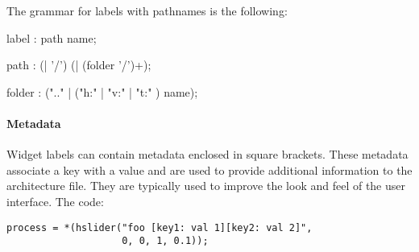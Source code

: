 The grammar for labels with pathnames is the following:

\begin{rail}
 label : path name;
\end{rail}

\begin{rail}
 path : (| '/') (| (folder '/')+);
\end{rail}

\begin{rail}
 folder : (".." | ("h:" | "v:" | "t:" ) name);
\end{rail}

\paragraph{Metadata}
Widget labels can contain metadata enclosed in square brackets. These metadata associate a key with a value and are used to provide additional information to the architecture file.  They are typically used to improve the look and feel of the user interface. 
The \faust code:
\begin{lstlisting}
process = *(hslider("foo [key1: val 1][key2: val 2]", 
					0, 0, 1, 0.1));
\end{lstlisting}

